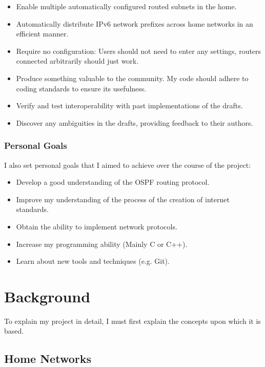 \begin{itemize}
\item Enable multiple automatically configured routed subnets in the home.
\item Automatically distribute IPv6 network prefixes across home networks in an efficient
	manner. 
\item Require no configuration: Users should not need to enter any settings,
  routers connected arbitrarily should just work.
\item Produce something valuable to the community. My code should
  adhere to coding standards to ensure its usefulness.
\item Verify and test interoperability with past implementations of the drafts.
\item Discover any ambiguities in the drafts, providing feedback to their authors.
\end{itemize}

\raggedbottom
\pagebreak

\subsection{Personal Goals}
I also set personal goals that I aimed to achieve over the course of the
project:
\begin{itemize}
	\item Develop a good understanding of the OSPF routing protocol.
	\item Improve my understanding of the process of the creation of internet
		standards.
	\item Obtain the ability to implement network protocols.
	\item Increase my programming ability (Mainly C or C++).
	\item Learn about new tools and techniques (e.g. Git).
\end{itemize}

\chapter{Background}
To explain my project in detail, I must first explain the concepts upon which
it is based.

\section{Home Networks}

